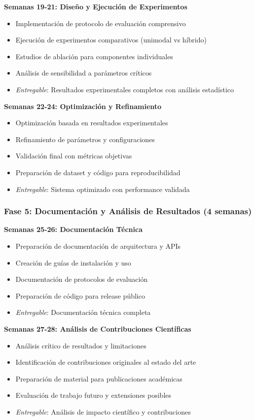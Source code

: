 \documentclass[12pt,a4paper]{article}
\begin{document}
\textbf{Semanas 19-21: Diseño y Ejecución de Experimentos}
\begin{itemize}
    \item Implementación de protocolo de evaluación comprensivo
    \item Ejecución de experimentos comparativos (unimodal vs híbrido)
    \item Estudios de ablación para componentes individuales
    \item Análisis de sensibilidad a parámetros críticos
    \item \textit{Entregable}: Resultados experimentales completos con análisis estadístico
\end{itemize}

\textbf{Semanas 22-24: Optimización y Refinamiento}
\begin{itemize}
    \item Optimización basada en resultados experimentales
    \item Refinamiento de parámetros y configuraciones
    \item Validación final con métricas objetivas
    \item Preparación de dataset y código para reproducibilidad
    \item \textit{Entregable}: Sistema optimizado con performance validada
\end{itemize}

\subsubsection{Fase 5: Documentación y Análisis de Resultados (4 semanas)}

\textbf{Semanas 25-26: Documentación Técnica}
\begin{itemize}
    \item Preparación de documentación de arquitectura y APIs
    \item Creación de guías de instalación y uso
    \item Documentación de protocolos de evaluación
    \item Preparación de código para release público
    \item \textit{Entregable}: Documentación técnica completa
\end{itemize}

\textbf{Semanas 27-28: Análisis de Contribuciones Científicas}
\begin{itemize}
    \item Análisis crítico de resultados y limitaciones
    \item Identificación de contribuciones originales al estado del arte
    \item Preparación de material para publicaciones académicas
    \item Evaluación de trabajo futuro y extensiones posibles
    \item \textit{Entregable}: Análisis de impacto científico y contribuciones
\end{itemize}
\end{document}

